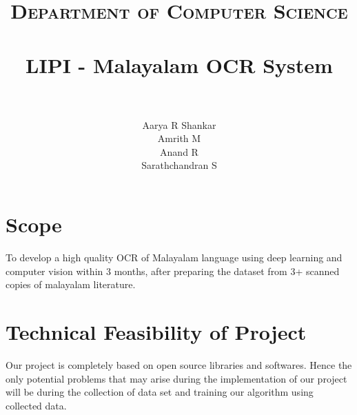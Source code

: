 \documentclass[paper=a4, fontsize=11pt]{scrartcl}
\title{
		\usefont{OT1}{bch}{b}{n}
		\normalfont \normalsize \textsc{Department of Computer Science} \\ [25pt]
		\horrule{0.5pt} \\[0.4cm]
		\huge LIPI - Malayalam OCR System \\
		\horrule{2pt} \\[0.5cm]
}
\author{
		\normalfont 								\normalsize
        Aarya R Shankar\\[-3pt]		\normalsize
        Amrith M\\[-3pt]		\normalsize
        Anand R\\[-3pt]		\normalsize
        \newline
        Sarathchandran S\\[-3pt]		\normalsize
}
\date{}
\numberwithin{equation}{section}		%
\numberwithin{figure}{section}			%
\numberwithin{table}{section}				%
\begin{document}
\maketitle
\section{Scope}
To develop a high quality OCR of Malayalam language using deep learning and computer vision within 3 months, after preparing the dataset from 3+ scanned copies of malayalam literature.





\section{ Technical Feasibility of Project}
Our project is completely based on open source libraries and softwares. Hence the only potential problems that may arise during the implementation of our project will be during the collection of data set and training our algorithm using collected data.
\end{document}
